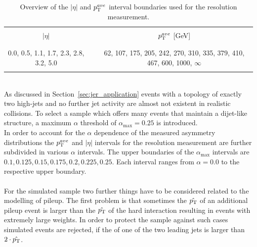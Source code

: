 \begin{table}[!tp]
\centering
\caption{Overview of the $|\eta|$ and $p_{\text{T}}^{ave}$ interval boundaries used for the resolution measurement.}
\label{tab:binning}
\begin{tabular}{ccc}
\hline
 & &  \\
 $|\eta|$ & & $p_{\text{T}}^{ave}$ [GeV] \\
 & &  \\
\hline
 & &  \\
 0.0, 0.5, 1.1, 1.7, 2.3, 2.8, 3.2, 5.0 & & 62, 107, 175, 205, 242, 270, 310, 335, 379, 410, 467, 600, 1000, $\infty$ \\
 & &  \\
\hline
\end{tabular}%
\end{table} 
\\
As discussed in Section~\ref{sec:jer_application} events with a topology of exactly two high-\pt jets and no further jet activity are almost not existent in realistic collisions. To select a sample which offers many events that maintain a dijet-like structure, a maximum $\alpha$ threshold of $\alpha_\mathrm{max} = 0.25$ is introduced. \\
In order to account for the $\alpha$ dependence of the measured asymmetry distributions the $p_{\text{T}}^{ave}$ and $|\eta|$ intervals for the resolution measurement are further subdivided in various $\alpha$ intervals. The upper boundaries of the $\alpha_\mathrm{max}$ intervals are $0.1, 0.125, 0.15, 0.175, 0.2, 0.225, 0.25$. Each interval ranges from $\alpha = 0.0$ to the respective upper boundary. \\
\\
For the simulated sample two further things have to be considered related to the modelling of pileup. The first problem is that sometimes the $\hat{p_{\text{T}}}$ of an additional pileup event is larger than the $\hat{p_{\text{T}}}$ of the hard interaction resulting in events with extremely large weights. In order to protect the sample against such cases simulated events are rejected, if the \pt of one of the two leading jets is larger than $2 \cdot \hat{p_{\text{T}}}$.\\
